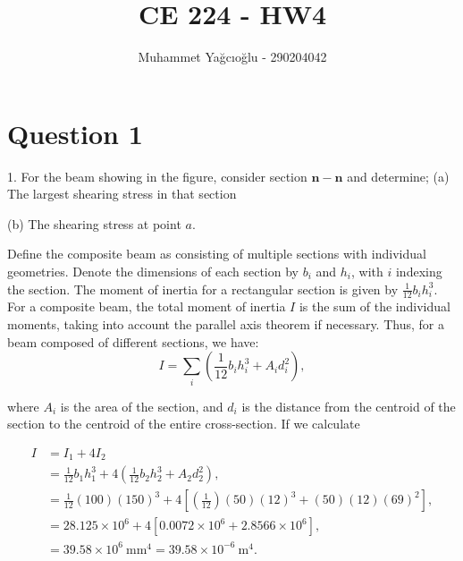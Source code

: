 \documentclass[12pt]{article}
\title{\vspace{-1cm}CE 224 - HW4}
\author{Muhammet Yağcıoğlu - 290204042}
\begin{document}
\maketitle\thispagestyle{fancy}
\pagestyle{fancy}
\tableofcontents
\newpage



\section*{Question 1}
\begin{q}
1. For the beam showing in the figure, consider section \(\boldsymbol{n}-\boldsymbol{n}\) and determine;
(a) The largest shearing stress in that section

(b) The shearing stress at point \(a\).
\end{q}
\begin{figure}[!ht]
    \centering
    \caption{}
    \label{fig:enter-label}
\end{figure}

Define the composite beam as consisting of multiple sections with individual geometries. Denote the dimensions of each section by \( b_i \) and \( h_i \), with \( i \) indexing the section. The moment of inertia for a rectangular section is given by \( \frac{1}{12} b_i h_i^3 \). For a composite beam, the total moment of inertia \( I \) is the sum of the individual moments, taking into account the parallel axis theorem if necessary. Thus, for a beam composed of different sections, we have:
\[ I = \sum_{i} \left( \frac{1}{12} b_i h_i^3 + A_i d_i^2 \right), \]

where \( A_i \) is the area of the section, and \( d_i \) is the distance from the centroid of the section to the centroid of the entire cross-section. If we calculate

\[
\begin{aligned}
I & =I_1+4 I_2 \\
& =\frac{1}{12} b_1 h_1^3+4\left(\frac{1}{12} b_2 h_2^3+A_2 d_2^2\right), \\
& =\frac{1}{12}(100)(150)^3+4\left[\left(\frac{1}{12}\right)(50)(12)^3+(50)(12)(69)^2\right], \\
& =28.125 \times 10^6+4\left[0.0072 \times 10^6+2.8566 \times 10^6\right], \\
& =39.58 \times 10^6 \mathrm{~mm}^4=39.58 \times 10^{-6} \mathrm{~m}^4.
\end{aligned}
\]
\end{document}
